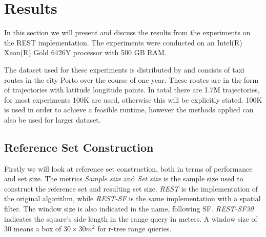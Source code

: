 \chapter{Results}
\label{chap:res}
In this section we will present and discuss the results from the experiments on the REST implementation. The experiments were conducted on an Intel(R) Xeon(R) Gold 6426Y processor with 500 GB RAM.

The dataset used for these experiments is distributed by \textcite{porto} and consists of taxi routes in the city Porto over the course of one year. These routes are in the form of trajectories with latitude longitude points. In total there are 1.7M trajectories, for most experiments 100K are used, otherwise this will be explicitly stated. 100K is used in order to achieve a feasible runtime, however the methods applied can also be used for larger dataset.

\section{Reference Set Construction}
Firstly we will look at reference set construction, both in terms of performance and set size. The metrics \textit{Sample size} and \textit{Set size} is the sample size used to construct the reference set and resulting set size. \textit{REST} is the implementation of the original algorithm, while \textit{REST-SF} is the same implementation with a spatial filter. The window size is also indicated in the name, following SF. \textit{REST-SF30} indicates the square's side length in the range query in meters. A window size of 30 means a box of $30\times30m^2$ for r-tree range queries.

